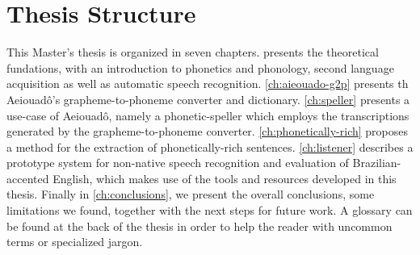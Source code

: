 \section*{Thesis Structure}

This Master's thesis is organized in seven chapters. \label{ch:foundations} presents the theoretical fundations, with an introduction to phonetics and phonology, second language acquisition as well as automatic speech recognition. \autoref{ch:aieouado-g2p} presents th Aeiouad\^o's grapheme-to-phoneme converter and dictionary. \autoref{ch:speller} presents a use-case of Aeiouad\^o, namely a phonetic-speller which employs the transcriptions generated by the grapheme-to-phoneme converter. \autoref{ch:phonetically-rich} proposes a method for the extraction of phonetically-rich sentences. \autoref{ch:listener} describes a prototype system for non-native speech recognition and evaluation of Brazilian-accented English, which makes use of the tools and resources developed in this thesis. Finally in \autoref{ch:conclusions}, we present the overall conclusions, some limitations we found, together with the next steps for future work. A glossary can be found at the back of the thesis in order to help the reader with uncommon terms or specialized jargon.